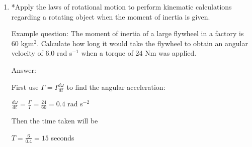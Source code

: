 \documentclass{article}
\begin{document}
\begin {enumerate}
\
\item *Apply the laws of rotational motion to perform kinematic calculations regarding a rotating object when
the moment of inertia is given.

Example question: The moment of inertia of a large flywheel in a factory is 60 kgm$^2$. Calculate how long it would take the flywheel to obtain an angular velocity of 6.0 rad s$^{-1}$ when a torque of 24 Nm was applied.

Answer:

First use $\Gamma=I \frac{d\omega}{dt}$ to find the angular acceleration:

$\frac{d\omega}{dt}=\frac{\Gamma}{I}=\frac{24}{60}= 0.4$ rad s$^{-2}$

Then the time taken will be

$T=\frac{6}{0.4}=15$ seconds



\end {enumerate}



\normalsize	
\end{document}
